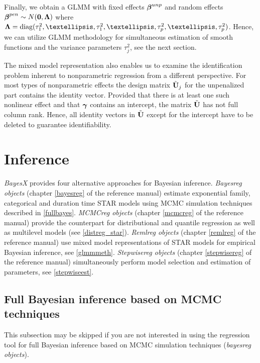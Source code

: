 \documentclass[11pt,a4paper,twoside]{bayesxarticle}
\begin{document}
Finally, we obtain a GLMM with fixed effects $\boldsymbol{\beta}^{unp}$ and
random effects $\boldsymbol{\beta}^{pen} \sim N(\boldsymbol{0},\boldsymbol{\Lambda})$ where $\Lambdavec =
\diag(\tau^2_1,\dots,\tau^2_1,\dots,\tau^2_p,\dots,\tau^2_p)$.
Hence, we can utilize GLMM methodology for simultaneous estimation
of smooth functions and the variance parameters $\tau^2_j$, see the
next section.

The mixed model representation also enables us to examine the
identification problem inherent to nonparametric regression from a
different perspective. For most types of nonparametric effects the
design matrix $\tilde{\mathbf{U}}_j$ for the unpenalized part contains the
identity vector. Provided that there is at least one such nonlinear
effect and that $\boldsymbol{\gamma}$ contains an intercept, the matrix
$\tilde{\mathbf{U}}$ has not full column rank. Hence, all identity vectors in
$\tilde{\mathbf{U}}$ except for the intercept have to be deleted to guarantee
identifiability.


\section{Inference}
\label{inference}

{\em BayesX} provides four alternative approaches for Bayesian inference. {\em Bayesreg objects} (chapter \ref*{bayesreg} of
the reference manual) estimate exponential family, categorical and duration time STAR models using MCMC simulation techniques described in \autoref{fullbayes}.
{\em MCMCreg objects} (chapter \ref*{mcmcreg} of the reference manual) provide the counterpart for distributional and quantile regression as well as multilevel models (see \autoref{distreg_star}).
{\em Remlreg objects} (chapter \ref*{remlreg} of the reference manual) use mixed model representations of STAR models for empirical Bayesian
inference, see \autoref{glmmmeth}. {\em Stepwisereg objects} (chapter \ref*{stepwisereg} of the reference manual)
simultaneously perform model selection and estimation of parameters, see \autoref{stepwiseest}.



\subsection{Full Bayesian inference based on MCMC techniques}
\label{fullbayes}

This subsection may be skipped if you are not interested in using
the regression tool for full Bayesian inference based on MCMC
simulation techniques ({\em bayesreg objects}).
\end{document}
